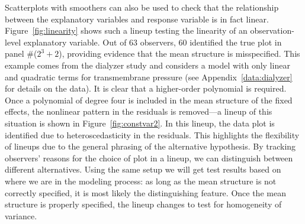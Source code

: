 \documentclass[12pt]{article} %
\newcommand{\al}[1]{{\color{ForestGreen} #1}}
\newcommand{\alnote}[1]{\todo[inline,color=green!40]{#1}} %
\newcommand{\hhnote}[1]{\todo[inline,color=orange!40]{#1}}
\begin{document}
Scatterplots with smoothers can also be used to check that the relationship between the explanatory variables and response variable is in fact linear. Figure~\ref{fig:linearity} shows such a lineup testing the linearity of an observation-level explanatory variable. Out of 63 observers, 60 identified the true plot in panel \#($2^3 + 2$), providing evidence that the mean structure is misspecified. This example comes from the dialyzer study and considers a model with only linear and quadratic terms for transmembrane pressure (see Appendix~\ref{data:dialyzer} for details on the data). It is clear that a higher-order polynomial is required. 
Once a polynomial of degree four is included in the mean structure of the fixed effects, \al{the nonlinear pattern in} the residuals is \al{removed}---a lineup of this situation is shown in Figure~\ref{fig:constvar2}. In this lineup, the data plot is identified due to heteroscedasticity in the residuals.  This highlights the flexibility of lineups due to the general phrasing of the alternative hypothesis. By tracking observers' reasons for the choice of plot in a lineup, we can distinguish between different alternatives. 
Using the same setup we will get test results based on where we are in the modeling process: as long as the mean structure is not correctly specified, it is most likely the distinguishing feature. Once the mean structure is properly specified, the lineup changes to test for homogeneity of variance. 
\end{document}
